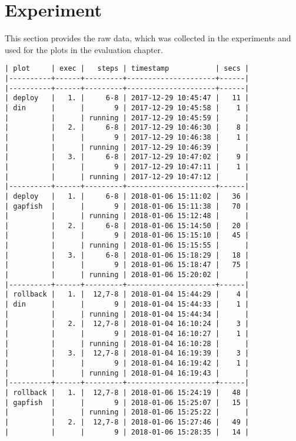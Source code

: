 \section*{Experiment}
This section provides the raw data, which was collected in the experiments and used for
the plots in the evaluation chapter.
\begin{verbatim}
| plot     | exec |   steps | timestamp           | secs |
|----------+------+---------+---------------------+------|
|----------+------+---------+---------------------+------|
| deploy   |   1. |     6-8 | 2017-12-29 10:45:47 |   11 |
| din      |      |       9 | 2017-12-29 10:45:58 |    1 |
|          |      | running | 2017-12-29 10:45:59 |      |
|          |   2. |     6-8 | 2017-12-29 10:46:30 |    8 |
|          |      |       9 | 2017-12-29 10:46:38 |    1 |
|          |      | running | 2017-12-29 10:46:39 |      |
|          |   3. |     6-8 | 2017-12-29 10:47:02 |    9 |
|          |      |       9 | 2017-12-29 10:47:11 |    1 |
|          |      | running | 2017-12-29 10:47:12 |      |
|----------+------+---------+---------------------+------|
| deploy   |   1. |     6-8 | 2018-01-06 15:11:02 |   36 |
| gapfish  |      |       9 | 2018-01-06 15:11:38 |   70 |
|          |      | running | 2018-01-06 15:12:48 |      |
|          |   2. |     6-8 | 2018-01-06 15:14:50 |   20 |
|          |      |       9 | 2018-01-06 15:15:10 |   45 |
|          |      | running | 2018-01-06 15:15:55 |      |
|          |   3. |     6-8 | 2018-01-06 15:18:29 |   18 |
|          |      |       9 | 2018-01-06 15:18:47 |   75 |
|          |      | running | 2018-01-06 15:20:02 |      |
|----------+------+---------+---------------------+------|
| rollback |   1. |  12,7-8 | 2018-01-04 15:44:29 |    4 |
| din      |      |       9 | 2018-01-04 15:44:33 |    1 |
|          |      | running | 2018-01-04 15:44:34 |      |
|          |   2. |  12,7-8 | 2018-01-04 16:10:24 |    3 |
|          |      |       9 | 2018-01-04 16:10:27 |    1 |
|          |      | running | 2018-01-04 16:10:28 |      |
|          |   3. |  12,7-8 | 2018-01-04 16:19:39 |    3 |
|          |      |       9 | 2018-01-04 16:19:42 |    1 |
|          |      | running | 2018-01-04 16:19:43 |      |
|----------+------+---------+---------------------+------|
| rollback |   1. |  12,7-8 | 2018-01-06 15:24:19 |   48 |
| gapfish  |      |       9 | 2018-01-06 15:25:07 |   15 |
|          |      | running | 2018-01-06 15:25:22 |      |
|          |   2. |  12,7-8 | 2018-01-06 15:27:46 |   49 |
|          |      |       9 | 2018-01-06 15:28:35 |   14 |

\end{verbatim}
